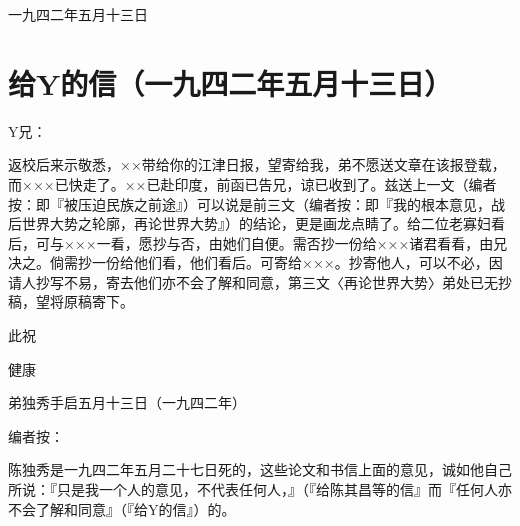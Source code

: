 \documentclass[
  openany,           %
  12pt,              %
  a4paper            %
]{ctexbook}
\begin{document}
\hfill 一九四二年五月十三日

\chapter{给Y的信（一九四二年五月十三日）}

\quad\quad Y兄：

\quad\quad 返校后来示敬悉，××带给你的江津日报，望寄给我，弟不愿送文章在该报登载，而×××已快走了。××已赴印度，前函已告兄，谅已收到了。兹送上一文（编者按：即『被压迫民族之前途』）可以说是前三文（编者按：即『我的根本意见，战后世界大势之轮廓，再论世界大势』）的结论，更是画龙点睛了。给二位老寡妇看后，可与×××一看，愿抄与否，由她们自便。需否抄一份给×××诸君看看，由兄决之。倘需抄一份给他们看，他们看后。可寄给×××。抄寄他人，可以不必，因请人抄写不易，寄去他们亦不会了解和同意，第三文〈再论世界大势〉弟处已无抄稿，望将原稿寄下。

\quad\quad 此祝

健康

\hfill 弟独秀手启\quad 五月十三日（一九四二年）

编者按：

\quad\quad 陈独秀是一九四二年五月二十七日死的，这些论文和书信上面的意见，诚如他自己所说：『只是我一个人的意见，不代表任何人，』（『给陈其昌等的信』而『任何人亦不会了解和同意』（『给Y的信』）的。

\end{document}
